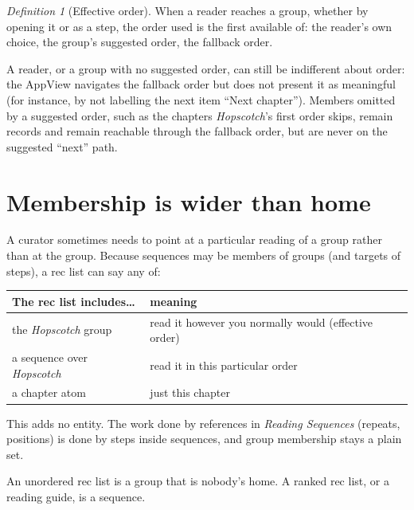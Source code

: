 \documentclass{amsart}
\theoremstyle{remark}
\newtheorem{defn}{Definition}
\begin{document}
\begin{defn}[Effective order]When a reader reaches a group, whether by opening it or as a step, the order used is the first available of: the reader's own choice, the group's suggested order, the fallback order.\end{defn}
A reader, or a group with no suggested order, can still be indifferent about order: the AppView navigates the fallback order but does not present it as meaningful (for instance, by not labelling the next item ``Next chapter''). Members omitted by a suggested order, such as the chapters \emph{Hopscotch}'s first order skips, remain records and remain reachable through the fallback order, but are never on the suggested ``next'' path.

\section{Membership is wider than home}
A curator sometimes needs to point at a particular reading of a group rather than at the group. Because sequences may be members of groups (and targets of steps), a rec list can say any of:
\begin{center}\small
\begin{tabular}{ll}
The rec list includes\ldots & meaning \\ \hline
the \emph{Hopscotch} group & read it however you normally would (effective order) \\
a sequence over \emph{Hopscotch} & read it in this particular order \\
a chapter atom & just this chapter \\
\end{tabular}
\end{center}
This adds no entity. The work done by references in \emph{Reading Sequences} (repeats, positions) is done by steps inside sequences, and group membership stays a plain set.

An unordered rec list is a group that is nobody's home. A ranked rec list, or a reading guide, is a sequence.
\end{document}
